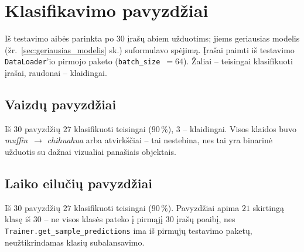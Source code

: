 \section{Klasifikavimo pavyzdžiai}
\label{sec:pavyzdziu_klasifikacija}

Iš testavimo aibės parinkta po $30$ įrašų abiem užduotims; jiems geriausias modelis (žr.~\ref{sec:geriausias_modelis} sk.) suformulavo spėjimą. Įrašai paimti iš testavimo \texttt{DataLoader}'io pirmojo paketo (\texttt{batch\_size}~$=64$). Žaliai – teisingai klasifikuoti įrašai, raudonai – klaidingai.

\subsection{Vaizdų pavyzdžiai}
\label{subsec:pavyzdziai_vaizdai}



Iš $30$ pavyzdžių $27$ klasifikuoti teisingai ($90\,\%$), $3$ – klaidingai. Visos klaidos buvo \textit{muffin}~$\rightarrow$ \textit{chihuahua} arba atvirkščiai – tai nestebina, nes tai yra binarinė užduotis su dažnai vizualiai panašiais objektais.

\subsection{Laiko eilučių pavyzdžiai}
\label{subsec:pavyzdziai_keystroke}



Iš $30$ pavyzdžių $27$ klasifikuoti teisingai ($90\,\%$). Pavyzdžiai apima $21$ skirtingą klasę iš $30$ – ne visos klasės pateko į pirmąjį $30$ įrašų poaibį, nes \texttt{Trainer.get\_sample\_predictions} ima iš pirmųjų testavimo paketų, neužtikrindamas klasių subalansavimo.
